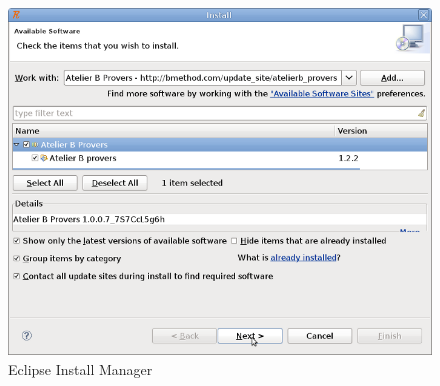 \begin{figure}[!h]
\begin{center}
	\includegraphics{img/tutorial/tut_02_install3.png}
	\caption{Eclipse Install Manager}
	\label{fig_tut_02_install_manager}
\end{center}
\end{figure}

